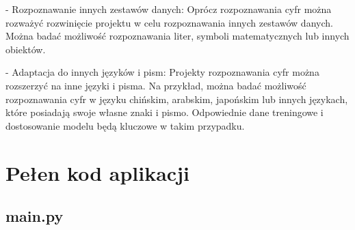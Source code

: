 \documentclass[12pt,a4paper]{article}
\begin{document}
- Rozpoznawanie innych zestawów danych: Oprócz rozpoznawania cyfr można rozważyć rozwinięcie projektu w celu
rozpoznawania innych zestawów danych. Można badać możliwość rozpoznawania liter, symboli matematycznych
lub innych obiektów.

- Adaptacja do innych języków i pism: Projekty rozpoznawania cyfr można rozszerzyć na inne języki i pisma.
Na przykład, można badać możliwość rozpoznawania cyfr w języku chińskim, arabskim, japońskim lub innych językach,
które posiadają swoje własne znaki i pismo. Odpowiednie dane treningowe i dostosowanie modelu
będą kluczowe w takim przypadku.
\section{Pełen kod aplikacji}
\subsection{main.py}
\end{document}
